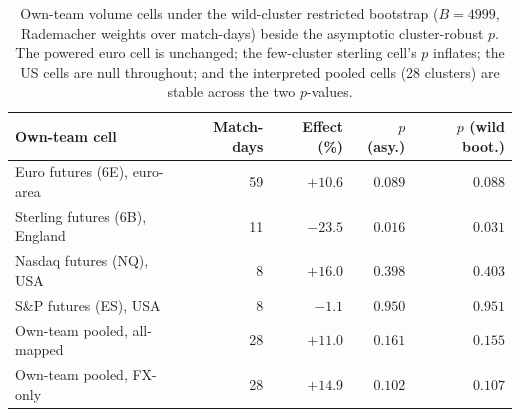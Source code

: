 \documentclass[12pt]{article}
\begin{document}
\begin{table}[h]\centering\small\setlength{\tabcolsep}{7pt}
\caption{Own-team volume cells under the wild-cluster restricted bootstrap ($B=4999$, Rademacher weights over match-days) beside the asymptotic cluster-robust $p$. The powered euro cell is unchanged; the few-cluster sterling cell's $p$ inflates; the US cells are null throughout; and the interpreted pooled cells (28 clusters) are stable across the two $p$-values.}\label{tab:boot}
\begin{tabular}{lrrrr}\toprule
Own-team cell & Match-days & Effect (\%) & $p$ (asy.) & $p$ (wild boot.) \\\midrule
Euro futures (6E), euro-area    & 59 & $+10.6$ & $0.089$ & $0.088$ \\
Sterling futures (6B), England  & 11 & $-23.5$ & $0.016$ & $0.031$ \\
Nasdaq futures (NQ), USA        & 8  & $+16.0$ & $0.398$ & $0.403$ \\
S\&P futures (ES), USA          & 8  & $-1.1$  & $0.950$ & $0.951$ \\
Own-team pooled, all-mapped     & 28 & $+11.0$ & $0.161$ & $0.155$ \\
Own-team pooled, FX-only        & 28 & $+14.9$ & $0.102$ & $0.107$ \\\bottomrule
\end{tabular}
\end{table}
\end{document}
